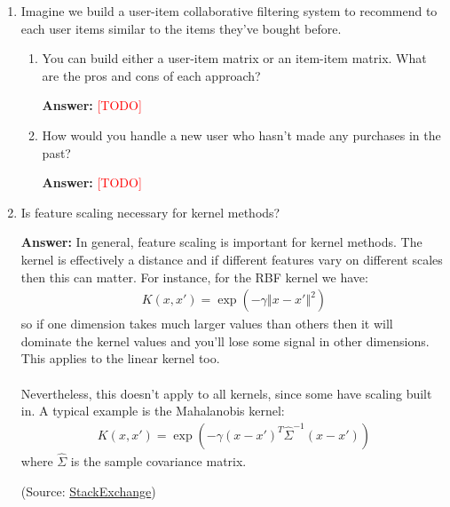 \documentclass{article}
\newenvironment{QandA}{\begin{enumerate}[label=\arabic*.]}{\end{enumerate}}
\newenvironment{InnerQandA}{\begin{enumerate}[label=\roman*.]}{\end{enumerate}}
\newenvironment{answer}{\par\normalfont \textbf{Answer:}}{}
\newcommand{\todo}{\textcolor{red}{[TODO]}}
\begin{document}
\begin{QandA}
    \item Imagine we build a user-item collaborative filtering system to recommend to each user items similar to the items they’ve bought before.
    \begin{InnerQandA}
        \item You can build either a user-item matrix or an item-item matrix. What are the pros and cons of each approach?
        \begin{answer}
            \todo 
        \end{answer}

        \item How would you handle a new user who hasn’t made any purchases in the past?
        \begin{answer}
            \todo
        \end{answer}
    \end{InnerQandA}

    \item Is feature scaling necessary for kernel methods?
    \begin{answer}
        In general, feature scaling is important for kernel methods. The kernel is effectively a distance and if different features vary on different scales then this can matter. For instance, for the RBF kernel we have:
        \begin{align*}
            K(x, x') = \exp \left(-\gamma \left\Vert x - x'\right\Vert^2 \right)
        \end{align*}
        so if one dimension takes much larger values than others then it will dominate the kernel values and you'll lose some signal in other dimensions. This applies to the linear kernel too. \\\\
        Nevertheless, this doesn't apply to all kernels, since some have scaling built in. A typical example is the Mahalanobis kernel:
        \begin{align*}
            K(x, x') = \exp \left(-\gamma (x - x')^T\hat{\Sigma}^{-1}(x-x') \right)
        \end{align*}
        where $\hat{\Sigma}$ is the sample covariance matrix.

        (Source: \href{https://stats.stackexchange.com/questions/305906/feature-scaling-in-svm-does-it-depend-on-the-kernel}{StackExchange})
    \end{answer}


\end{QandA}
\end{document}
